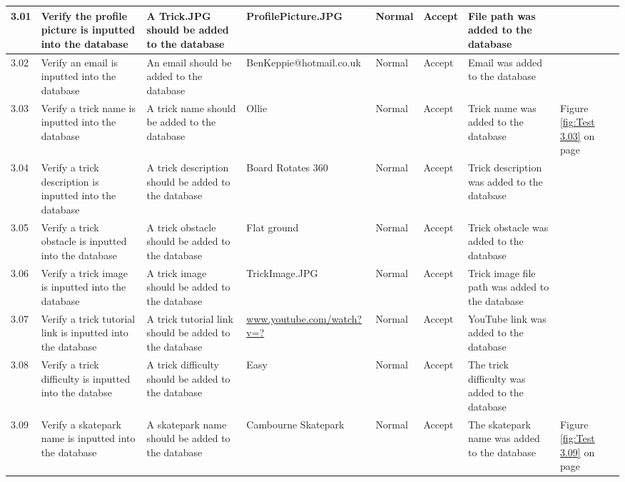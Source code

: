 \begin{landscape}
\begin{center}
\begin{longtable}{|p{1.5cm}|p{2.5cm}|p{2.5cm}|p{2cm}|p{2cm}|p{2cm}|p{2cm}|p{2cm}|}
3.01 & Verify the profile picture is inputted into the database & A Trick.JPG should be added to the database & ProfilePicture.JPG & Normal & Accept & File path was added to the database & \\ \hline

3.02 & Verify an email is inputted into the database & An email should be added to the database & BenKeppie@hotmail.co.uk & Normal & Accept  & Email was added to the database & \\ \hline

3.03 & Verify a trick name is inputted into the database & A trick name should be added to the database & Ollie & Normal & Accept & Trick name was added to the database & Figure \ref{fig:Test 3.03} on page \pageref{fig:Test 3.03} \\ \hline

3.04 & Verify a trick description is inputted into the database & A trick description should be added to the database & Board Rotates 360 & Normal & Accept & Trick description was added to the database & \\ \hline

3.05  & Verify a trick obstacle is inputted into the database & A trick obstacle should be added to the database & Flat ground & Normal & Accept & Trick obstacle was added to the database & \\ \hline

3.06 & Verify a trick image is inputted into the database & A trick image should be added to the database & TrickImage.JPG & Normal & Accept & Trick image file path was added to the database& \\ \hline

3.07 & Verify a trick tutorial link is inputted into the database & A trick tutorial link should be added to the database & \url{www.youtube.com/watch?v=?} & Normal & Accept & YouTube link was added to the database & \\ \hline

3.08 & Verify a trick difficulty is inputted into the databse & A trick difficulty should be added to the database & Easy & Normal & Accept & The trick difficulty was added to the database & \\ \hline

3.09 & Verify a skatepark name is inputted into the database & A skatepark name should be added to the database & Cambourne Skatepark & Normal & Accept & The skatepark name was added to the database & Figure \ref{fig:Test 3.09} on page \pageref{fig:Test 3.09} \\ \hline


\end{longtable}
\end{center}
\end{landscape}
